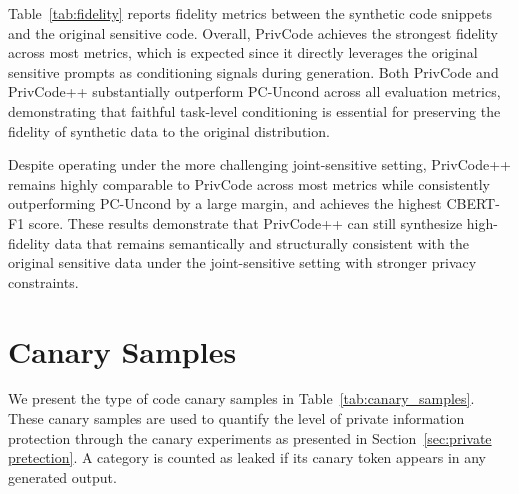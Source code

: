 \documentclass{article}
\theoremstyle{plain}
\theoremstyle{definition}
\theoremstyle{remark}
\def \toolname{PrivCode++}
\begin{document}
{Table~\ref{tab:fidelity} reports fidelity metrics between the synthetic code snippets and the original sensitive code. Overall, PrivCode achieves the strongest fidelity across most metrics, which is expected since it directly leverages the original sensitive prompts as conditioning signals during generation.
Both PrivCode and \toolname{} substantially outperform PC-Uncond across all evaluation metrics, demonstrating that faithful task-level conditioning is essential for preserving the fidelity of synthetic data to the original distribution.

Despite operating under the more challenging joint-sensitive setting, \toolname{} remains highly comparable to PrivCode across most metrics while consistently outperforming PC-Uncond by a large margin, and achieves the highest CBERT-F1 score. These results demonstrate that \toolname{} can still synthesize high-fidelity data that remains semantically and structurally consistent with the original sensitive data under the joint-sensitive setting with stronger privacy constraints.











\section{Canary Samples}
\label{app:canary_samples}

We present the type of code canary samples in Table~\ref{tab:canary_samples}. These canary samples are used to quantify the level of private information protection through the canary experiments as presented in Section~\ref{sec:private pretection}. A category is counted as leaked if its canary token appears in any generated output.




\begin{table}[h]
\centering
\footnotesize
    \caption{Five code canary samples injected into the OSS-Instruct PII Dataset for the private information leakage analysis.}
    

\end{table}}
\end{document}
